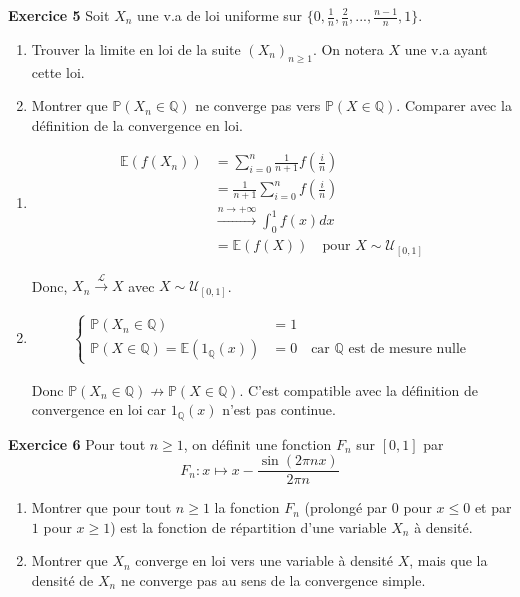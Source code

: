 \documentclass[french]{article}
\begin{document}
	\begin{tcolorbox}[colback=gray!5!white,colframe=gray!75!black]
		\textbf{\large{Exercice 5}} \newline
		Soit $X_n$ une v.a de loi uniforme sur $\{0, \frac{1}{n}, \frac{2}{n}, ..., \frac{n-1}{n}, 1\}$.
		\begin{enumerate}
			\item Trouver la limite en loi de la suite $(X_n)_{n \geq 1}$. On notera $X$ une v.a ayant cette loi.
			\item Montrer que $\mathbb{P}(X_n \in \mathbb{Q})$ ne converge pas vers $\mathbb{P}(X \in \mathbb{Q})$. Comparer avec la définition de la convergence en loi.
		\end{enumerate}
	\end{tcolorbox}

	\begin{enumerate}
		\item
	\begin{align}
		\mathbb{E}(f(X_n)) &= \sum_{i=0}^n \frac{1}{n+1} f\left(\frac{i}{n}\right)\\
		&= \frac{1}{n+1} \sum_{i=0}^{n} f\left(\frac{i}{n}\right)\\
		&\xrightarrow{n \to +\infty} \int_{0}^{1} f(x) dx\\
		&= \mathbb{E}(f(X)) \quad \text{pour $X \sim \mathcal{U}_{[0,1]}$}
	\end{align}
		
	Donc, $X_n \xrightarrow{\mathcal{L}} X$ avec $X \sim \mathcal{U}_{[0,1]}$.		
	
		\item
	\begin{align}
		\begin{cases}
		\mathbb{P}(X_n \in \mathbb{Q}) &= 1\\
		\mathbb{P}(X \in \mathbb{Q}) = \mathbb{E}(\mathfrak{1}_{\mathbb{Q}}(x)) &= 0 \quad \text{car $\mathbb{Q}$ est de mesure nulle}
		\end{cases}
	\end{align}
	
	Donc $\mathbb{P}(X_n \in \mathbb{Q}) \not\to \mathbb{P}(X \in \mathbb{Q})$. C'est compatible avec la définition de convergence en loi car $\mathfrak{1}_{\mathbb{Q}}(x)$ n'est pas continue.
		
	\end{enumerate}

	\begin{tcolorbox}[colback=gray!5!white,colframe=gray!75!black]
		\textbf{\large{Exercice 6}} \newline
		Pour tout $n \geq 1$, on définit une fonction $F_n$ sur $[0,1]$ par
		\[F_n : x \mapsto x - \frac{\sin(2\pi nx)}{2\pi n}\]
		\begin{enumerate}
			\item Montrer que pour tout $n \geq 1$ la fonction $F_n$ (prolongé par $0$ pour $x \leq 0$ et par $1$ pour $x \geq 1$) est la fonction de répartition d'une variable $X_n$ à densité.
			\item Montrer que $X_n$ converge en loi vers une variable à densité $X$, mais que la densité de $X_n$ ne converge pas au sens de la convergence simple.
		\end{enumerate}
	\end{tcolorbox}
\end{document}
